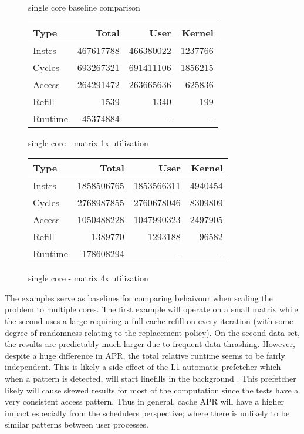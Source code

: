 \documentclass[11pt]{article}
\begin{document}
\begin{figure*}[!h]
	\caption{single core baseline comparison}
	\centering
	\begin{subtable}{.48\linewidth}
		\centering
		\begin{tabular}{ l|rrr }
			Type    & Total     & User      & Kernel  \\
			\hline
			Instrs  & 467617788 & 466380022 & 1237766 \\ 
			Cycles  & 693267321 & 691411106 & 1856215 \\ 
			Access  & 264291472 & 263665636 & 625836  \\ 
			Refill  & 1539      & 1340      & 199     \\ 
			Runtime & 45374884  & -         & -       \\ 
			\hline
		\end{tabular}
		\caption{single core - matrix 1x utilization}
	\end{subtable}
	\hfill
	\begin{subtable}{.48\linewidth}
		\centering
		\begin{tabular}{ l|rrr }
			Type    & Total      & User       & Kernel  \\
			\hline
			Instrs  & 1858506765 & 1853566311 & 4940454 \\ 
			Cycles  & 2768987855 & 2760678046 & 8309809 \\ 
			Access  & 1050488228 & 1047990323 & 2497905 \\ 
			Refill  & 1389770    & 1293188    & 96582   \\ 
			Runtime & 178608294  & -          & -       \\ 
			\hline
		\end{tabular}
		\caption{single core - matrix 4x utilization}
	\end{subtable}
\end{figure*}

The examples serve as baselines for comparing behaivour when scaling the problem to multiple cores.  The first example will operate on a small matrix while the second uses a large requiring a full cache refill on every iteration (with some degree of randomness relating to the replacement policy).  On the second data set, the results are predictably much larger due to frequent data thrashing.  However, despite a huge difference in APR, the total relative runtime seems to be fairly independent.  This is likely a side effect of the L1 automatic prefetcher which when a pattern is detected, will start linefills in the background \cite{arm-l1-prefetch}.  This prefetcher likely will cause skewed results for most of the computation since the tests have a very consistent access pattern.  Thus in general, cache APR will have a higher impact especially from the schedulers perspective; where there is unlikely to be similar patterns between user processes.
\end{document}
